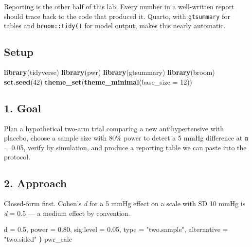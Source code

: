 \documentclass[
]{article}
\newenvironment{Shaded}{\begin{snugshade}}{\end{snugshade}}
\newcommand{\AttributeTok}[1]{\textcolor[rgb]{0.13,0.29,0.53}{#1}}
\newcommand{\DecValTok}[1]{\textcolor[rgb]{0.00,0.00,0.81}{#1}}
\newcommand{\ErrorTok}[1]{\textcolor[rgb]{0.64,0.00,0.00}{\textbf{#1}}}
\newcommand{\FloatTok}[1]{\textcolor[rgb]{0.00,0.00,0.81}{#1}}
\newcommand{\FunctionTok}[1]{\textcolor[rgb]{0.13,0.29,0.53}{\textbf{#1}}}
\newcommand{\NormalTok}[1]{#1}
\newcommand{\OtherTok}[1]{\textcolor[rgb]{0.56,0.35,0.01}{#1}}
\newcommand{\StringTok}[1]{\textcolor[rgb]{0.31,0.60,0.02}{#1}}
\begin{document}
Reporting is the other half of this lab. Every number in a well-written
report should trace back to the code that produced it. Quarto, with
\texttt{gtsummary} for tables and \texttt{broom::tidy()} for model
output, makes this nearly automatic.

\subsection{Setup}\label{setup}

\begin{Shaded}
\begin{Highlighting}[]
\FunctionTok{library}\NormalTok{(tidyverse)}
\FunctionTok{library}\NormalTok{(pwr)}
\FunctionTok{library}\NormalTok{(gtsummary)}
\FunctionTok{library}\NormalTok{(broom)}
\FunctionTok{set.seed}\NormalTok{(}\DecValTok{42}\NormalTok{)}
\FunctionTok{theme\_set}\NormalTok{(}\FunctionTok{theme\_minimal}\NormalTok{(}\AttributeTok{base\_size =} \DecValTok{12}\NormalTok{))}
\end{Highlighting}
\end{Shaded}

\subsection{1. Goal}\label{goal}

Plan a hypothetical two-arm trial comparing a new antihypertensive with
placebo, choose a sample size with 80\% power to detect a 5 mmHg
difference at α = 0.05, verify by simulation, and produce a reporting
table we can paste into the protocol.

\subsection{2. Approach}\label{approach}

Closed-form first. Cohen's \emph{d} for a 5 mmHg effect on a scale with
SD 10 mmHg is \emph{d} = 0.5 --- a medium effect by convention.

\begin{Shaded}
\begin{Highlighting}[]
\NormalTok{  d }\OtherTok{=} \FloatTok{0.5}\NormalTok{, power }\OtherTok{=} \FloatTok{0.80}\NormalTok{, sig.level }\OtherTok{=} \FloatTok{0.05}\NormalTok{,}
\NormalTok{  type }\OtherTok{=} \StringTok{"two.sample"}\NormalTok{, alternative }\OtherTok{=} \StringTok{"two.sided"}
\ErrorTok{)}
\NormalTok{pwr\_calc}
\end{Highlighting}
\end{Shaded}
\end{document}
